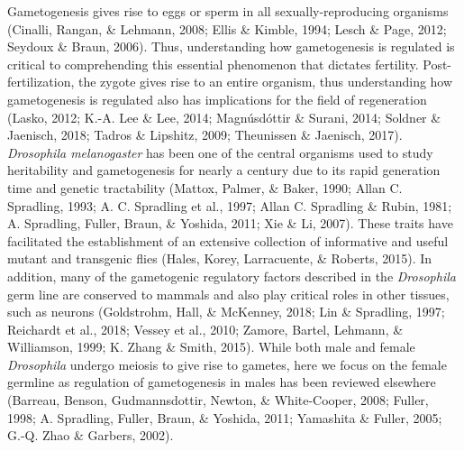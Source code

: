 \documentclass[12pt,oneside]{reedthesis}
\begin{document}
Gametogenesis gives rise to eggs or sperm in all sexually-reproducing
organisms (Cinalli, Rangan, \& Lehmann, 2008; Ellis \& Kimble, 1994; Lesch \& Page, 2012; Seydoux \& Braun, 2006).
Thus, understanding how gametogenesis is regulated is critical to
comprehending this essential phenomenon that dictates fertility.
Post-fertilization, the zygote gives rise to an entire organism, thus
understanding how gametogenesis is regulated also has implications for
the field of regeneration (Lasko, 2012; K.-A. Lee \& Lee, 2014; Magnúsdóttir \& Surani, 2014; Soldner \& Jaenisch, 2018; Tadros \& Lipshitz, 2009; Theunissen \& Jaenisch, 2017).
\emph{Drosophila melanogaster} has been one of the central organisms used to
study heritability and gametogenesis for nearly a century due to its
rapid generation time and genetic tractability (Mattox, Palmer, \& Baker, 1990; Allan C. Spradling, 1993; A. C. Spradling et al., 1997; Allan C. Spradling \& Rubin, 1981; A. Spradling, Fuller, Braun, \& Yoshida, 2011; Xie \& Li, 2007). These traits have facilitated the establishment of an
extensive collection of informative and useful mutant and transgenic
flies (Hales, Korey, Larracuente, \& Roberts, 2015). In addition, many of the gametogenic regulatory
factors described in the \emph{Drosophila} germ line are conserved to mammals
and also play critical roles in other tissues, such as neurons
(Goldstrohm, Hall, \& McKenney, 2018; Lin \& Spradling, 1997; Reichardt et al., 2018; Vessey et al., 2010; Zamore, Bartel, Lehmann, \& Williamson, 1999; K. Zhang \& Smith, 2015). While both male and female \emph{Drosophila}
undergo meiosis to give rise to gametes, here we focus on the female
germline as regulation of gametogenesis in males has been reviewed
elsewhere (Barreau, Benson, Gudmannsdottir, Newton, \& White-Cooper, 2008; Fuller, 1998; A. Spradling, Fuller, Braun, \& Yoshida, 2011; Yamashita \& Fuller, 2005; G.-Q. Zhao \& Garbers, 2002).
\end{document}

